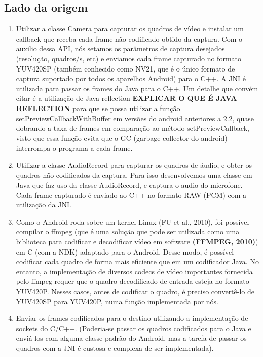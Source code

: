 \documentclass{acm_proc_article-sp}
\newcommand{\todo}[1]{\textcolor[rgb]{1.00,0.00,0.00}{\bf \uppercase{#1}}}
\begin{document}
\subsection{Lado da origem}
\begin{enumerate}
 \item Utilizar a classe Camera para capturar os quadros de vídeo e instalar um callback que receba cada frame não codificado obtido da captura. Com o auxilio dessa API, nós setamos os parâmetros de captura desejados (resolução, quadros/s, etc) e enviamos cada frame capturado no formato YUV420SP (também conhecido como NV21, que é o único formato de captura suportado por todos os aparelhos Android) para o C++. A JNI é utilizada para passar os frames do Java para o C++.
Um detalhe que convém citar é a utilização de Java reflection \todo{explicar o que é java reflection} para que se possa utilizar a função setPreviewCallbackWithBuffer em versões do android anteriores a 2.2, quase dobrando a taxa de frames em comparação ao método setPreviewCallback, visto que essa função evita que o GC (garbage collector do android) interrompa o programa a cada frame.
 \item Utilizar a classe AudioRecord para capturar os quadros de áudio, e obter os quadros não codificados da captura. Para isso desenvolvemos uma classe em Java que faz uso da classe AudioRecord, e captura o audio do microfone. Cada frame capturado é enviado ao C++ no formato RAW (PCM) com a utilização da JNI.
 \item Como o Android roda sobre um kernel Linux (FU et al., 2010), foi possível compilar o ffmpeg (que é uma solução que pode ser utilizada como uma biblioteca para codificar e decodificar vídeo em software \todo{(FFMPEG, 2010)}) em C (com a NDK) adaptado para o Android. Desse modo, é possível codificar cada quadro de forma mais eficiente que em um codificador Java. No entanto, a implementação de diversos codecs de vídeo importantes fornecida pelo ffmpeg requer que o quadro decodificado de entrada esteja no formato YUV420P. Nesses casos, antes de codificar o quadro, é preciso convertê-lo de YUV420SP para YUV420P, numa função implementada por nós.
 \item Enviar os frames codificados para o destino utilizando a implementação de sockets do C/C++. (Poderia-se passar os quadros codificados para o Java e enviá-los com alguma classe padrão do Android, mas a tarefa de passar os quadros com a JNI é custosa e complexa de ser implementada).
\end{enumerate}
\end{document}
